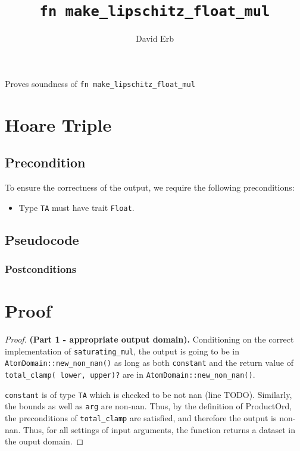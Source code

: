 \documentclass{article}
\title{\texttt{fn make\_lipschitz\_float\_mul}}
\author{David Erb}
\date{}
\begin{document}
\maketitle

Proves soundness of \texttt{fn make\_lipschitz\_float\_mul}


\section{Hoare Triple}
\subsection*{Precondition}
To ensure the correctness of the output, we require the following preconditions:

\begin{itemize}
    \item Type \texttt{TA} must have trait \texttt{Float}.
\end{itemize}

\subsection*{Pseudocode}


\subsubsection*{Postconditions}

\section{Proof}

\begin{proof}
    \textbf{(Part 1 - appropriate output domain).}
    Conditioning on the correct implementation of \texttt{saturating\_mul}, the output is going to be in \texttt{AtomDomain::new\_non\_nan()} as long as both \texttt{constant} and the return value of \texttt{total\_clamp( lower, upper)?} are in \texttt{AtomDomain::new\_non\_nan()}.
    
    \texttt{constant} is of type \texttt{TA} which is checked to be not nan (line TODO). Similarly, the bounds as well as \texttt{arg} are non-nan. Thus, by the definition of ProductOrd, the preconditions of \texttt{total\_clamp} are satisfied, and therefore the output is non-nan. Thus, for all settings of input arguments, the function returns a dataset in the ouput domain.
\end{proof}
\end{document}
